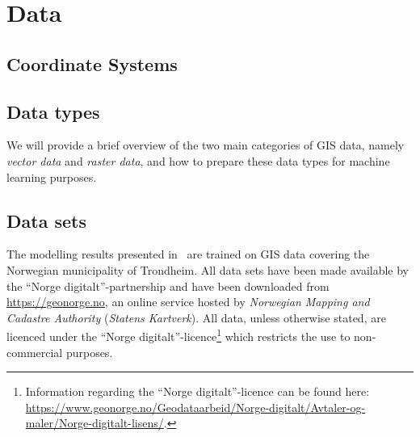\section{Data}%
\label{sec:data}



\subsection{Coordinate Systems}%
\label{sec:coordinate-systems}


\subsection{Data types}%
\label{sec:data-types}

We will provide a brief overview of the two main categories of GIS data, namely \textit{vector data} and \textit{raster data}, and how to prepare these data types for machine learning purposes.



%
\label{sec:raster-data}


\subsection{Data sets}%
\label{sec:data-sets}

The modelling results presented in~ are trained on GIS data covering the Norwegian municipality of Trondheim.
All data sets have been made available by the \enquote{Norge digitalt}-partnership and have been downloaded from \url{https://geonorge.no}, an online service hosted by \textit{Norwegian Mapping and Cadastre Authority} (\textit{Statens Kartverk}).
All data, unless otherwise stated, are licenced under the \enquote{Norge digitalt}-licence\footnote{Information regarding the \enquote{Norge digitalt}-licence can be found here:\\ \url{https://www.geonorge.no/Geodataarbeid/Norge-digitalt/Avtaler-og-maler/Norge-digitalt-lisens/}.} which restricts the use to non-commercial purposes.




